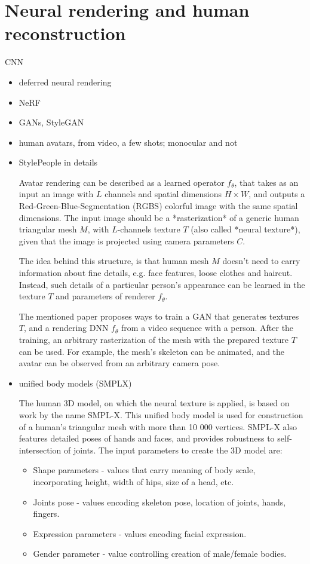 \section{Neural rendering and human reconstruction}
\alert{CNN}
\label{lit:nrender}
\begin{itemize}
	\item deferred neural rendering \cite{dnn:deferred19}
	\item NeRF \cite{dnn:nerf20,dnn:phorhum22}
	\item GANs, StyleGAN \cite{dnn:gan14, dnn:stylegan-v1-19,dnn:stylegan-v2-20,dnn:stylegan-v3-21,survey:gans:18}
	\item human avatars, from video, a few shots; monocular and not \cite{dnn:volumetric-primitives21}
	\item StylePeople in details \cite{dnn:stylepeople21}
	
	Avatar rendering can be described as a learned operator $f_\theta$, that takes as an input an image with $L$ channels and spatial dimensions $H \times W$, and outputs a Red-Green-Blue-Segmentation (RGBS) colorful image with the same spatial dimensions. The input image should be a *rasterization* of a generic human triangular mesh $M$, with $L$-channels texture $T$ (also called *neural texture*), given that the image is projected using camera parameters $C$. 
	
	The idea behind this structure, is that human mesh $M$ doesn't need to carry information about fine details, e.g. face features, loose clothes and haircut. Instead, such details of a particular person's appearance can be learned in the texture $T$ and parameters of renderer $f_\theta$. 
	
	The mentioned paper proposes ways to train a GAN that generates textures $T$, and a rendering DNN $f_\theta$ from a video sequence with a person. After the training, an arbitrary rasterization of the mesh with the prepared texture $T$ can be used. For example, the mesh's skeleton can be animated, and the avatar can be observed from an arbitrary camera pose. 
	
	\item unified body models (SMPLX) \cite{dnn:smpl15, dnn:smplify16, dnn:smplx19}
	
	The human 3D model, on which the neural texture is applied, is based on work by the name SMPL-X. This unified body model is used for construction of a human's triangular mesh with more than 10 000 vertices. SMPL-X also features detailed poses of hands and faces, and provides robustness to self-intersection of joints. The input parameters to create the 3D model are:
	\begin{itemize}
		\item  Shape parameters - values that carry meaning of body scale, incorporating height, width of hips, size of a head, etc.
		\item  Joints pose - values encoding skeleton pose, location of joints, hands, fingers.
		\item  Expression parameters - values encoding facial expression.
		\item  Gender parameter - value controlling creation of male/female bodies.
	\end{itemize}


\end{itemize}
